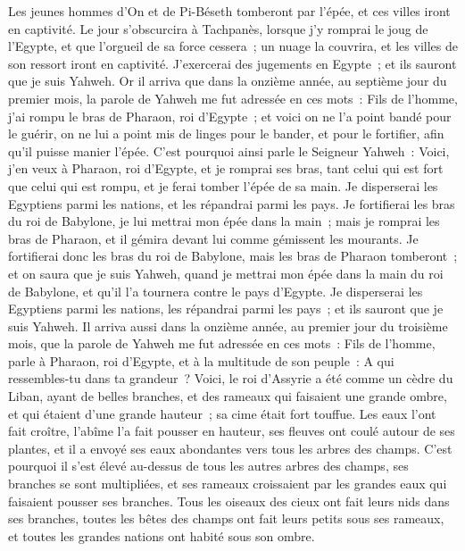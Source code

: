 \begin{multicols}{2}
Les jeunes hommes d'On et de Pi-Béseth tomberont par l'épée, et ces villes iront en captivité.
Le jour s'obscurcira à Tachpanès, lorsque j'y romprai le joug de l'Egypte, et que l'orgueil de sa force cessera~; un nuage la couvrira, et les villes de son ressort iront en captivité.
J'exercerai des jugements en Egypte~; et ils sauront que je suis Yahweh.
Or il arriva que dans la onzième année, au septième jour du premier mois, la parole de Yahweh me fut adressée en ces mots~:
Fils de l'homme, j'ai rompu le bras de Pharaon, roi d'Egypte~; et voici on ne l'a point bandé pour le guérir, on ne lui a point mis de linges pour le bander, et pour le fortifier, afin qu'il puisse manier l'épée.
C'est pourquoi ainsi parle le Seigneur Yahweh~: Voici, j'en veux à Pharaon, roi d'Egypte, et je romprai ses bras, tant celui qui est fort que celui qui est rompu, et je ferai tomber l'épée de sa main.
Je disperserai les Egyptiens parmi les nations, et les répandrai parmi les pays.
Je fortifierai les bras du roi de Babylone, je lui mettrai mon épée dans la main~; mais je romprai les bras de Pharaon, et il gémira devant lui comme gémissent les mourants.
Je fortifierai donc les bras du roi de Babylone, mais les bras de Pharaon tomberont~; et on saura que je suis Yahweh, quand je mettrai mon épée dans la main du roi de Babylone, et qu'il l'a tournera contre le pays d'Egypte.
Je disperserai les Egyptiens parmi les nations, les répandrai parmi les pays~; et ils sauront que je suis Yahweh.
\VerseOne{}Il arriva aussi dans la onzième année, au premier jour du troisième mois, que la parole de Yahweh me fut adressée en ces mots~:
Fils de l'homme, parle à Pharaon, roi d'Egypte, et à la multitude de son peuple~: A qui ressembles-tu dans ta grandeur~?
Voici, le roi d'Assyrie a été comme un cèdre du Liban, ayant de belles branches, et des rameaux qui faisaient une grande ombre, et qui étaient d'une grande hauteur~; sa cime était fort touffue.
Les eaux l'ont fait croître, l'abîme l'a fait pousser en hauteur, ses fleuves ont coulé autour de ses plantes, et il a envoyé ses eaux abondantes vers tous les arbres des champs.
C'est pourquoi il s'est élevé au-dessus de tous les autres arbres des champs, ses branches se sont multipliées, et ses rameaux croissaient par les grandes eaux qui faisaient pousser ses branches.
Tous les oiseaux des cieux ont fait leurs nids dans ses branches, toutes les bêtes des champs ont fait leurs petits sous ses rameaux, et toutes les grandes nations ont habité sous son ombre.

\end{multicols}
